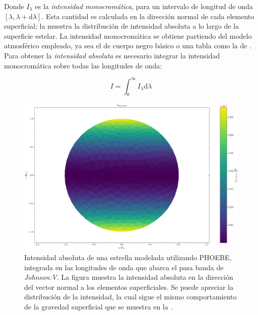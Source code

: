 Donde $I_{\lambda}$ es la \textit{intensidad monocromática}, para un intervalo
de longitud de onda $[\lambda, \lambda + \textrm{d}\lambda]$. Esta cantidad es
calculada en la dirección normal de cada elemento superficial; la
 muestra la distribución de
intensidad absoluta a lo largo de la superficie estelar. La intensidad
monocromática se obtiene partiendo del modelo atmosférico empleado, ya sea el de
cuerpo negro básico o una tabla como la de . Para
obtener la \textit{intensidad absoluta} es necesario integrar la intensidad
monocromática sobre todas las longitudes de onda:

\begin{eqfloat}[!ht]
	\centering
	\begin{equation}
		I = \int_{0}^{\infty}{I_{\lambda} \textrm{d}\lambda}
	\end{equation}
	\blankcaption
	\label{ecuacionIntensidadTotal}
\end{eqfloat}

\begin{figure}[!ht]
	\centering
	\includegraphics[scale=0.4]{Introduccion/Figures/Figura PHOEBE Malla Intensidad Normal.png}
	\caption{Intensidad absoluta de una estrella modelada utilizando PHOEBE,
	integrada en las longitudes de onda que abarca el pasa banda de
	\textit{Johnson:V}. La figura muestra la intensidad absoluta en la dirección
	del vector normal a los elementos superficiales. Se puede apreciar la
	distribución de la intensidad, la cual sigue el mismo comportamiento de la
	gravedad superficial que se muestra en la
	.}
	\label{figuraMallaPhoebeIntensidadNormal}
\end{figure}

